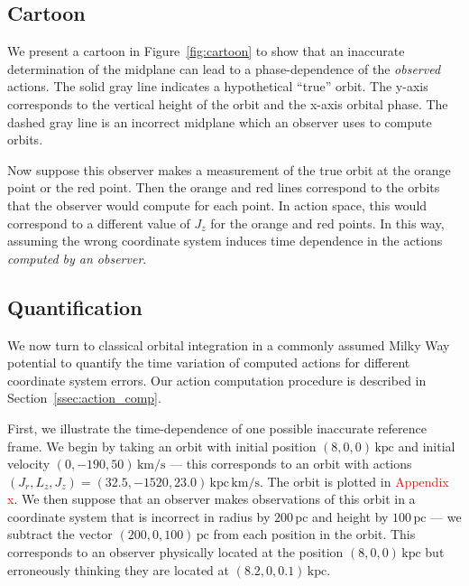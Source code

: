 \documentclass[twocolumn]{aastex62}
\newcommand{\Gus}[1]{\textcolor{red}{#1}}
\newcommand{\pc}{\text{pc}}
\newcommand{\kpc}{\text{kpc}}
\newcommand{\kms}{\text{km}/\text{s}}
\newcommand{\actunit}{\text{kpc}\,\kms}
\begin{document}
\subsection{Cartoon} \label{ssec:cartoon}
We present a cartoon in Figure~\ref{fig:cartoon} to show that an inaccurate
determination of the midplane can lead to a phase-dependence of the {\em
observed} actions. The solid gray line indicates a hypothetical ``true''
orbit. The y-axis corresponds to the vertical height of the orbit and the
x-axis orbital phase. The dashed gray line is an incorrect midplane which an
observer uses to compute orbits.

Now suppose this observer makes a measurement of the true orbit at the orange
point or the red point. Then the orange and red lines correspond to the orbits
that the observer would compute for each point. In action space, this would
correspond to a different value of $J_z$ for the orange and red points. In
this way, assuming the wrong coordinate system induces time dependence in the
actions {\em computed by an observer}.

\begin{figure*}
\caption{Caption.}
\label{fig:cartoon}
\end{figure*}

\subsection{Quantification} \label{ssec:quant}
We now turn to classical orbital integration in a commonly assumed Milky Way
potential to quantify the time variation of computed actions for different
coordinate system errors. Our action computation procedure is described in
Section~\ref{ssec:action_comp}.

First, we illustrate the time-dependence of one possible inaccurate reference
frame. We begin by taking an orbit with initial position $(8, 0, 0)\,\kpc$ and
initial velocity $(0, -190, 50)\,\kms$ --- this corresponds to an orbit with
actions $(J_r, L_z, J_z) = (32.5, -1520, 23.0)\,\actunit$. The orbit is
plotted in \Gus{Appendix x}. We then suppose that an observer makes
observations of this orbit in a coordinate system that is incorrect in radius by
$200\,\pc$ and height by $100\,\pc$ --- we subtract the vector $(200, 0,
100)\,\pc$ from each position in the orbit. This corresponds to an observer
physically located at the position $(8, 0, 0)\,\kpc$ but erroneously thinking
they are located at $(8.2, 0, 0.1)\,\kpc$.
\end{document}
